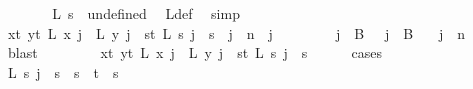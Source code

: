 \begin{isabellebody}
\ \ \ \ \isamarkupfalse%
\ \isamarkupfalse%
\ {\isachardoublequoteopen}L\ s\ {\isacharequal}{\kern0pt}\ undefined{\isachardoublequoteclose}\ \isamarkupfalse%
\ L{\isacharunderscore}{\kern0pt}def\ \isamarkupfalse%
\ simp\isanewline
\ \ \isamarkupfalse%
\isanewline
\ \ \isamarkupfalse%
\ \isamarkupfalse%
\ {\isachardoublequoteopen}{\isacharparenleft}{\kern0pt}{\isasymforall}x{\isacharless}{\kern0pt}t{\isachardot}{\kern0pt}\ {\isasymforall}y{\isacharless}{\kern0pt}t{\isachardot}{\kern0pt}\ L\ x\ j\ {\isacharequal}{\kern0pt}\ L\ y\ j{\isacharparenright}{\kern0pt}\ {\isasymor}\ {\isacharparenleft}{\kern0pt}{\isasymforall}s{\isacharless}{\kern0pt}t{\isachardot}{\kern0pt}\ L\ s\ j\ {\isacharequal}{\kern0pt}\ s{\isacharparenright}{\kern0pt}{\isachardoublequoteclose}\ \ {\isachardoublequoteopen}j\ {\isacharless}{\kern0pt}\ n{\isachardoublequoteclose}\ \ j\isanewline
\ \ \isamarkupfalse%
{\isacharminus}{\kern0pt}\isanewline
\ \ \ \ \isamarkupfalse%
\ {\isachardoublequoteopen}j\ {\isasymin}\ B\ {}{\isachardoublequoteclose}\ {\isacharbar}{\kern0pt}\ {\isachardoublequoteopen}j\ {\isasymin}\ B\ {}{\isachardoublequoteclose}\ \isamarkupfalse%
\ {\isacartoucheopen}j\ {\isacharless}{\kern0pt}\ n{\isacartoucheclose}\ {}\ \isamarkupfalse%
\ blast\ \isanewline
\ \ \ \ \isamarkupfalse%
\ \isamarkupfalse%
\ {\isachardoublequoteopen}{\isacharparenleft}{\kern0pt}{\isasymforall}x{\isacharless}{\kern0pt}t{\isachardot}{\kern0pt}\ {\isasymforall}y{\isacharless}{\kern0pt}t{\isachardot}{\kern0pt}\ L\ x\ j\ {\isacharequal}{\kern0pt}\ L\ y\ j{\isacharparenright}{\kern0pt}\ {\isasymor}\ {\isacharparenleft}{\kern0pt}{\isasymforall}s{\isacharless}{\kern0pt}t{\isachardot}{\kern0pt}\ L\ s\ j\ {\isacharequal}{\kern0pt}\ s{\isacharparenright}{\kern0pt}{\isachardoublequoteclose}\isanewline
\ \ \ \ \isamarkupfalse%
\ {\isacharparenleft}{\kern0pt}cases{\isacharparenright}{\kern0pt}\isanewline
\ \ \ \ \ \ \isamarkupfalse%
\ {}\isanewline
\ \ \ \ \ \ \isamarkupfalse%
\ {\isachardoublequoteopen}L\ s\ j\ {\isacharequal}{\kern0pt}\ s{\isachardoublequoteclose}\ \ {\isachardoublequoteopen}s\ {\isacharless}{\kern0pt}\ t{\isachardoublequoteclose}\ \ s\isanewline
\ \ \ \ \ \ \isamarkupfalse%
{\isacharminus}{\kern0pt}\isanewline

\end{isabellebody}
